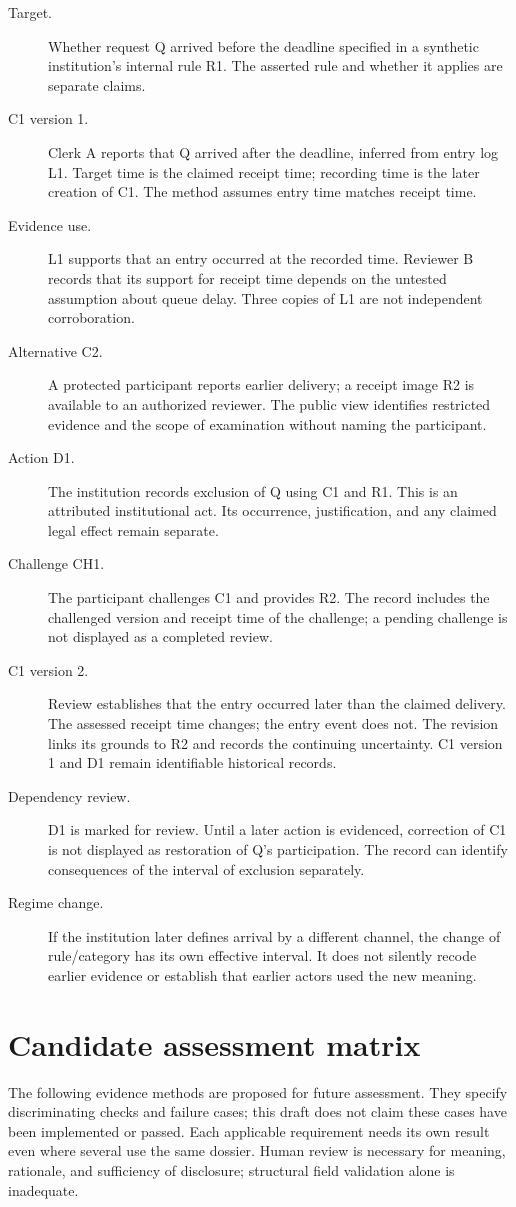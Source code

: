\documentclass[11pt,a4paper]{article}
\begin{document}
\begin{description}
\item[Target.] Whether request Q arrived before the deadline specified in a synthetic institution's internal rule R1. The asserted rule and whether it applies are separate claims.
\item[C1 version 1.] Clerk A reports that Q arrived after the deadline, inferred from entry log L1. Target time is the claimed receipt time; recording time is the later creation of C1. The method assumes entry time matches receipt time.
\item[Evidence use.] L1 supports that an entry occurred at the recorded time. Reviewer B records that its support for receipt time depends on the untested assumption about queue delay. Three copies of L1 are not independent corroboration.
\item[Alternative C2.] A protected participant reports earlier delivery; a receipt image R2 is available to an authorized reviewer. The public view identifies restricted evidence and the scope of examination without naming the participant.
\item[Action D1.] The institution records exclusion of Q using C1 and R1. This is an attributed institutional act. Its occurrence, justification, and any claimed legal effect remain separate.
\item[Challenge CH1.] The participant challenges C1 and provides R2. The record includes the challenged version and receipt time of the challenge; a pending challenge is not displayed as a completed review.
\item[C1 version 2.] Review establishes that the entry occurred later than the claimed delivery. The assessed receipt time changes; the entry event does not. The revision links its grounds to R2 and records the continuing uncertainty. C1 version 1 and D1 remain identifiable historical records.
\item[Dependency review.] D1 is marked for review. Until a later action is evidenced, correction of C1 is not displayed as restoration of Q's participation. The record can identify consequences of the interval of exclusion separately.
\item[Regime change.] If the institution later defines arrival by a different channel, the change of rule/category has its own effective interval. It does not silently recode earlier evidence or establish that earlier actors used the new meaning.
\end{description}

\section{Candidate assessment matrix}
The following evidence methods are proposed for future assessment. They specify discriminating checks and failure cases; this draft does not claim these cases have been implemented or passed. Each applicable requirement needs its own result even where several use the same dossier. Human review is necessary for meaning, rationale, and sufficiency of disclosure; structural field validation alone is inadequate.
\end{document}
